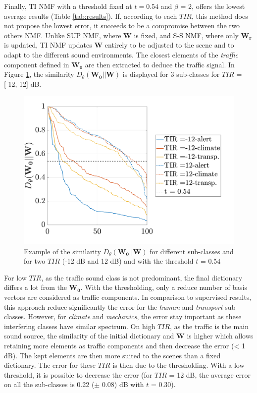 \documentclass[twocolumn,a4paper,10pt]{article}
\begin{document}
Finally, TI NMF with a threshold fixed at $t = 0.54$ and $\beta$ = 2, offers the lowest average results (Table \ref{tab:results}). If, according to each $TIR$, this method does not propose the lowest error, it succeeds to be a compromise between the two others NMF. Unlike SUP NMF, where $\mathbf{W}$ is fixed, and S-S NMF, where only $\mathbf{W_r}$ is updated, TI NMF updates $\mathbf{W}$ entirely to be adjusted to the scene and to adapt to the different sound environments. The closest elements of the \textit{traffic} component defined in $\mathbf{W_0}$ are then extracted to deduce the traffic signal. In Figure \ref{fig:dist_-12_12}, the similarity $D_{\theta}(\mathbf{W_0}||\mathbf{W})$ is displayed for 3 sub-classes for $TIR$ = [-12, 12] dB.

\begin{figure}[t]
    \centering
    \includegraphics[width=\linewidth]{figures/dist_-12_12.pdf}
    \caption{Example of the similarity $D_{\theta}\left( \mathbf{W_0} \vert \vert \mathbf{W}\right)$ for different sub-classes and for two $TIR$ (-12 dB and 12 dB) and with the threshold $t$ = 0.54}
    \label{fig:dist_-12_12}
\end{figure}

For low $TIR$, as the traffic sound class is not predominant, the final dictionary differs a lot from the $\mathbf{W_0}$. With the thresholding, only a reduce number of basis vectors are considered as traffic components. In comparison to supervised results, this approach reduce significantly the error for the \textit{human} and \textit{transport} sub-classes.  However, for \textit{climate} and \textit{mechanics}, the error stay important as these interfering classes have similar spectrum. On high $TIR$, as the traffic is the main sound source, the similarity of the initial dictionary and $\mathbf{W}$ is higher which allows retaining more elements as traffic components and then decrease the error (< 1 dB). The kept elements are then more suited to the scenes than a fixed dictionary. The error for these $TIR$ is then due to the thresholding. With a low threshold, it is possible to decrease the error (for $TIR$ = 12 dB, the average error on all the sub-classes is 0.22 ($\pm$ 0.08) dB with $t$ = 0.30).
\end{document}
